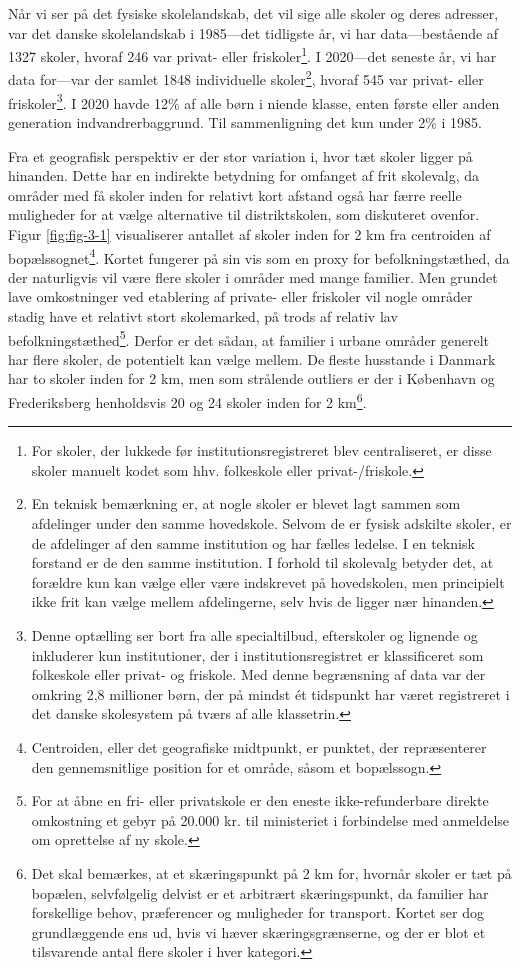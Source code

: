 \documentclass[
]{book}
\begin{document}
Når vi ser på det fysiske skolelandskab, det vil sige alle skoler og deres adresser, var det danske skolelandskab i 1985---det tidligste år, vi har data---bestående af 1327 skoler, hvoraf 246 var privat- eller friskoler\footnote{For skoler, der lukkede før institutionsregistreret blev centraliseret, er disse skoler manuelt kodet som hhv. folkeskole eller privat-/friskole.}. I 2020---det seneste år, vi har data for---var der samlet 1848 individuelle skoler\footnote{En teknisk bemærkning er, at nogle skoler er blevet lagt sammen som afdelinger under den samme hovedskole. Selvom de er fysisk adskilte skoler, er de afdelinger af den samme institution og har fælles ledelse. I en teknisk forstand er de den samme institution. I forhold til skolevalg betyder det, at forældre kun kan vælge eller være indskrevet på hovedskolen, men principielt ikke frit kan vælge mellem afdelingerne, selv hvis de ligger nær hinanden.}, hvoraf 545 var privat- eller friskoler\footnote{Denne optælling ser bort fra alle specialtilbud, efterskoler og lignende og inkluderer kun institutioner, der i institutionsregistret er klassificeret som folkeskole eller privat- og friskole. Med denne begrænsning af data var der omkring 2,8 millioner børn, der på mindst ét tidspunkt har været registreret i det danske skolesystem på tværs af alle klassetrin.}. I 2020 havde 12\% af alle børn i niende klasse, enten første eller anden generation indvandrerbaggrund. Til sammenligning det kun under 2\% i 1985.

Fra et geografisk perspektiv er der stor variation i, hvor tæt skoler ligger på hinanden. Dette har en indirekte betydning for omfanget af frit skolevalg, da områder med få skoler inden for relativt kort afstand også har færre reelle muligheder for at vælge alternative til distriktskolen, som diskuteret ovenfor. Figur \ref{fig:fig-3-1} visualiserer antallet af skoler inden for 2 km fra centroiden af bopælssognet\footnote{Centroiden, eller det geografiske midtpunkt, er punktet, der repræsenterer den gennemsnitlige position for et område, såsom et bopælssogn.}. Kortet fungerer på sin vis som en proxy for befolkningstæthed, da der naturligvis vil være flere skoler i områder med mange familier. Men grundet lave omkostninger ved etablering af private- eller friskoler vil nogle områder stadig have et relativt stort skolemarked, på trods af relativ lav befolkningstæthed\footnote{For at åbne en fri- eller privatskole er den eneste ikke-refunderbare direkte omkostning et gebyr på 20.000 kr. til ministeriet i forbindelse med anmeldelse om oprettelse af ny skole.}. Derfor er det sådan, at familier i urbane områder generelt har flere skoler, de potentielt kan vælge mellem. De fleste husstande i Danmark har to skoler inden for 2 km, men som strålende outliers er der i København og Frederiksberg henholdsvis 20 og 24 skoler inden for 2 km\footnote{Det skal bemærkes, at et skæringspunkt på 2 km for, hvornår skoler er tæt på bopælen, selvfølgelig delvist er et arbitrært skæringspunkt, da familier har forskellige behov, præferencer og muligheder for transport. Kortet ser dog grundlæggende ens ud, hvis vi hæver skæringsgrænserne, og der er blot et tilsvarende antal flere skoler i hver kategori.}.
\end{document}
